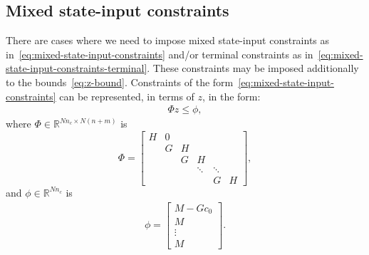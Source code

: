 \documentclass[12pt]{report}
\renewcommand{\Re}{\mathbb{R}}
\begin{document}
\subsection*{Mixed state-input constraints}
There are cases where we need to impose mixed state-input constraints 
as in~\eqref{eq:mixed-state-input-constraints} and/or
terminal constraints as in~\eqref{eq:mixed-state-input-constraints-terminal}.
These constraints may be imposed additionally to the bounds~\eqref{eq:z-bound}.
Constraints of the form~\eqref{eq:mixed-state-input-constraints} can be 
represented, in terms of $z$, in the form:
\begin{align}
\Phi z \leq \phi,
\end{align}
where $\Phi\in\Re^{Nn_c\times N(n+m)}$ is
\begin{equation}
\Phi=\left[\begin{array}{cccccc}
H & 0\\
& G  & H\\
&& G & H \\
&&& \ddots & \ddots\\
&&&& G & H
\end{array}\right],
\end{equation}
and $\phi\in\Re^{Nn_c}$ is
\begin{align}
\phi=\left[ \begin{array}{c}
M-Gc_0\\
M\\
\vdots\\
M
\end{array}\right].
\end{align}
\end{document}
